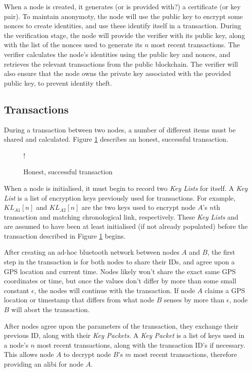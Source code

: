 \documentclass[12pt]{article}
\begin{document}
When a node is created, it generates (or is provided with?) a certificate (or key pair). To maintain anonymoty, the node will use the public key to encrypt some nonces to create identities, and use these identify itself in a transaction. During the verification stage, the node will provide the verifier with its public key, along with the list of the nonces used to generate its $n$ most recent transactions. The verifier calculates the node's identities using the public key and nonces, and retrieves the relevant transactions from the public blockchain. The verifier will also ensure that the node owns the private key associated with the provided public key, to prevent identity theft.

\subsection{Transactions}
During a transaction between two nodes, a number of different items must be shared and calculated. Figure \ref{fig:transaction} describes an honest, successful transaction.

\begin{figure}[h]
\resizebox {\columnwidth} {!} {}
\caption{Honest, successful transaction}
\label{fig:transaction}
\end{figure}

When a node is initialised, it must begin to record two \textit{Key Lists} for itself. A \textit{Key List} is a list of encryption keys previously used for transactions. For example, $KL_{A1}[n]$ and $KL_{A2}[n]$ are the two keys used to encrypt node $A$'s $n$th transaction and matching chronological link, respectively. These \textit{Key Lists} and are assumed to have been at least initialised (if not already populated) before the transaction described in Figure \ref{fig:transaction} begins.

After creating an ad-hoc bluetooth network between nodes $A$ and $B$, the first step in the transaction is for both nodes to share their IDs, and agree upon a GPS location and current time. Nodes likely won't share the exact same GPS coordinates or time, but once the values don't differ by more than some small constant $\epsilon$, the nodes will continue with the transaction. If node $A$ claims a GPS location or timestamp that differs from what node $B$ senses by more than $\epsilon$, node $B$ will abort the transaction.

After nodes agree upon the parameters of the transaction, they exchange their previous ID, along with their \textit{Key Packets}. A \textit{Key Packet} is a list of keys used in a node's $n$ most recent transactions, along with the transaction ID's if necessary. This allows node $A$ to decrypt node $B$'s $m$ most recent transactions, therefore providing an alibi for node $A$.
\end{document}
